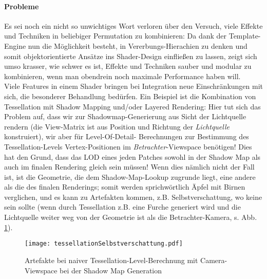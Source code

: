 	\paragraph{Probleme}
	Es sei noch ein nicht so unwichtiges Wort verloren über den Versuch, viele Effekte und Techniken in beliebiger
	Permutation zu kombinieren: Da dank der Template-Engine nun die Möglichkeit besteht, in Vererbungs-Hierachien zu denken
	und somit objektorientierte Ansätze ins Shader-Design einfließen zu lassen, zeigt sich umso krasser,
	wie schwer es ist, Effekte und Techniken sauber und modular zu kombinieren, wenn man obendrein noch maximale
	Performance haben will.\\
	Viele Features in einem Shader bringen bei Integration neue Einschränkungen mit sich, 
	die besonderer Behandlung bedürfen.
	Ein Beispiel ist die Kombination von Tessellation mit Shadow Mapping und/oder Layered Rendering: 
	Hier tut sich das Problem auf, dass wir zur Shadowmap-Generierung aus Sicht der Lichtquelle rendern 
	(die View-Matrix ist aus Position und Richtung der \emph{Lichtquelle} konstruiert), wir aber für Level-Of-Detail-	
	Berechnungen zur Bestimmung des Tessellation-Levels	Vertex-Positionen im \emph{Betrachter}-Viewspace benötigen!
	Dies hat den Grund, dass das LOD eines jeden Patches sowohl in der Shadow Map als auch im finalen Rendering
	gleich sein müssen! Wenn dies nämlich nicht der Fall ist, ist die Geometrie, die dem Shadow-Map-Lookup
	zugrunde liegt, eine andere als die des finalen Renderings; somit werden sprichwörtlich Äpfel mit Birnen verglichen,
	und es kann zu Artefakten kommen, z.B. Selbstverschattung, wo keine sein sollte (wenn durch Tessellation z.B.
	eine Furche generiert wird und die Lichtquelle weiter weg von der Geometrie ist als die Betrachter-Kamera, 
	s. Abb. \ref{fig:tessellationSelbstverschattung}).
	
	\begin{figure}[!h]
	\texttt{[image: tessellationSelbstverschattung.pdf]}
	\caption{Artefakte bei naiver Tessellation-Level-Berechnung mit Camera-Viewspace bei der Shadow Map Generation}
	\label{fig:tessellationSelbstverschattung}
	\end{figure}
	
